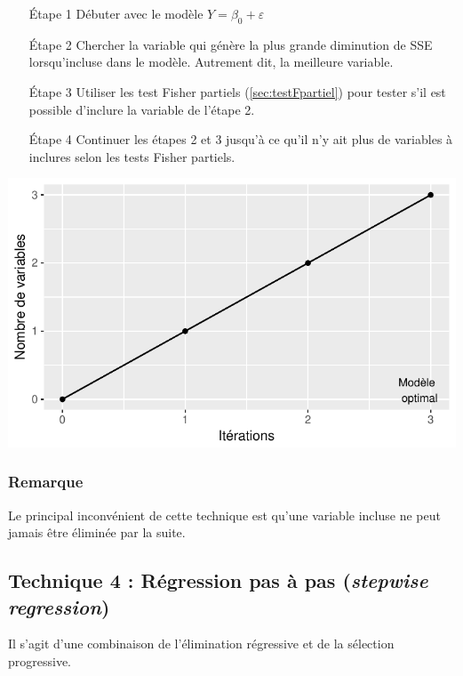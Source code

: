 \documentclass[11pt,french]{report}
\begin{document}
\begin{itemize}
\item [Étape 1] Débuter avec le modèle $Y = \beta_0 + \varepsilon$

\item [Étape 2] Chercher la variable qui génère la plus grande diminution de SSE lorsqu'incluse dans le modèle. Autrement dit, la meilleure variable.

\item [Étape 3] Utiliser les test Fisher partiels (\ref{sec:testFpartiel}) pour tester s'il est possible d'inclure la variable de l'étape 2.

\item [Étape 4] Continuer les étapes 2 et 3 jusqu'à ce qu'il n'y ait plus de variables à inclures selon les tests Fisher partiels.
\end{itemize}
\bigskip

\includegraphics{notes_de_cours-027}

\subsubsection*{Remarque}
Le principal inconvénient de cette technique est qu'une variable incluse ne peut jamais être éliminée par la suite. 

\subsection{Technique 4 : Régression pas à pas (\emph{stepwise regression})}
\label{tech4}

Il s'agit d'une combinaison de l'élimination régressive et de la sélection progressive.
\end{document}

